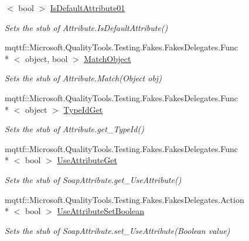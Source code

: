\begin{DoxyCompactItemize}
$<$ bool $>$ \hyperlink{class_system_1_1_runtime_1_1_remoting_1_1_metadata_1_1_fakes_1_1_stub_soap_attribute_a81e5b7edaec31e944e541ba2ced3bd9d}{Is\-Default\-Attribute01}
\begin{DoxyCompactList}\small\item\em Sets the stub of Attribute.\-Is\-Default\-Attribute()\end{DoxyCompactList}\item 
mqttf\-::\-Microsoft.\-Quality\-Tools.\-Testing.\-Fakes.\-Fakes\-Delegates.\-Func\\*
$<$ object, bool $>$ \hyperlink{class_system_1_1_runtime_1_1_remoting_1_1_metadata_1_1_fakes_1_1_stub_soap_attribute_a5356dba4555cabc76bfd863f25f66218}{Match\-Object}
\begin{DoxyCompactList}\small\item\em Sets the stub of Attribute.\-Match(\-Object obj)\end{DoxyCompactList}\item 
mqttf\-::\-Microsoft.\-Quality\-Tools.\-Testing.\-Fakes.\-Fakes\-Delegates.\-Func\\*
$<$ object $>$ \hyperlink{class_system_1_1_runtime_1_1_remoting_1_1_metadata_1_1_fakes_1_1_stub_soap_attribute_aceba6c06ada51cec9dbc5792cd12331f}{Type\-Id\-Get}
\begin{DoxyCompactList}\small\item\em Sets the stub of Attribute.\-get\-\_\-\-Type\-Id()\end{DoxyCompactList}\item 
mqttf\-::\-Microsoft.\-Quality\-Tools.\-Testing.\-Fakes.\-Fakes\-Delegates.\-Func\\*
$<$ bool $>$ \hyperlink{class_system_1_1_runtime_1_1_remoting_1_1_metadata_1_1_fakes_1_1_stub_soap_attribute_ad9827bba5db432fa9b6b11a9e9208fae}{Use\-Attribute\-Get}
\begin{DoxyCompactList}\small\item\em Sets the stub of Soap\-Attribute.\-get\-\_\-\-Use\-Attribute()\end{DoxyCompactList}\item 
mqttf\-::\-Microsoft.\-Quality\-Tools.\-Testing.\-Fakes.\-Fakes\-Delegates.\-Action\\*
$<$ bool $>$ \hyperlink{class_system_1_1_runtime_1_1_remoting_1_1_metadata_1_1_fakes_1_1_stub_soap_attribute_ae837d6de4d8b3d72fb2fde99fcb9050d}{Use\-Attribute\-Set\-Boolean}
\begin{DoxyCompactList}\small\item\em Sets the stub of Soap\-Attribute.\-set\-\_\-\-Use\-Attribute(\-Boolean value)\end{DoxyCompactList}\item 

\end{DoxyCompactItemize}
